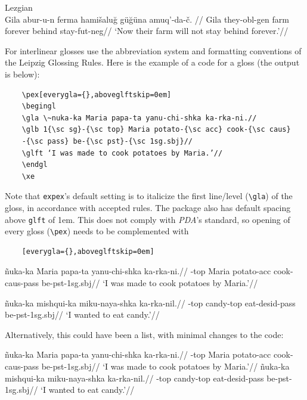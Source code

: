 \pex[everygla={},aboveglftskip=0em] \label{Lezgian} Lezgian \citep[from][207]{haspelmath_1993}\\
\begingl
\gla Gila abur-u-n ferma hami\v{s}alu\u{g} g\"{u}\u{g}\"{u}na amuq’-da-\v{c}. //
\glb Gila they-{\sc obl}-{\sc gen} farm forever behind stay-{\sc fut}-{\sc neg}//
\glft ‘Now their farm will not stay behind forever.’//
\endgl
\xe

For interlinear glosses use the abbreviation system and formatting conventions of the Leipzig Glossing Rules. Here is the example of a code for a gloss (the output is below):

\begin{verbatim}
    \pex[everygla={},aboveglftskip=0em]
    \begingl
    \gla \~nuka-ka Maria papa-ta yanu-chi-shka ka-rka-ni.//
    \glb 1{\sc sg}-{\sc top} Maria potato-{\sc acc} cook-{\sc caus}
    -{\sc pass} be-{\sc pst}-{\sc 1sg.sbj}//
    \glft ‘I was made to cook potatoes by Maria.’//
    \endgl
    \xe
\end{verbatim}

Note that \verb=expex='s default setting is to italicize the first line/level (\verb=\gla=) of the gloss, in accordance with accepted rules. The package also has default spacing above \verb=glft= of 1em. This does not comply with \textit{PDA}'s standard, so opening of every gloss (\verb=\pex=) needs to be complemented with 

\begin{verbatim}
    [everygla={},aboveglftskip=0em]
\end{verbatim}

\pex[everygla={},aboveglftskip=0em]
\begingl
\gla \~nuka-ka Maria papa-ta yanu-chi-shka ka-rka-ni.//
-{\sc top} Maria potato-{\sc acc} cook-{\sc caus}-{\sc pass} be-{\sc pst}-{\sc 1sg.sbj}//
\glft ‘I was made to cook potatoes by Maria.’//
\endgl
\xe

\pex[everygla={},aboveglftskip=0em] \begingl
\gla *\~nuka-ka mishqui-ka miku-naya-shka ka-rka-nil.//
-{\sc top} candy-{\sc top} eat-{\sc desid}-{\sc pass} be-{\sc pst}-1{\sc sg.sbj}//
\glft ‘I wanted to eat candy.’//
\endgl
\xe

Alternatively, this could have been a list, with minimal changes to the code:

\pex[everygla={},aboveglftskip=0em]
\a \begingl
\gla \~nuka-ka Maria papa-ta yanu-chi-shka ka-rka-ni.//
-{\sc top} Maria potato-{\sc acc} cook-{\sc caus}-{\sc pass} be-{\sc pst}-{\sc 1sg.sbj}//
\glft ‘I was made to cook potatoes by Maria.’//
\endgl
\a \begingl
\gla *\~nuka-ka mishqui-ka miku-naya-shka ka-rka-nil.//
-{\sc top} candy-{\sc top} eat-{\sc desid}-{\sc pass} be-{\sc pst}-1{\sc sg.sbj}//
\glft ‘I wanted to eat candy.’//
\endgl
\xe

